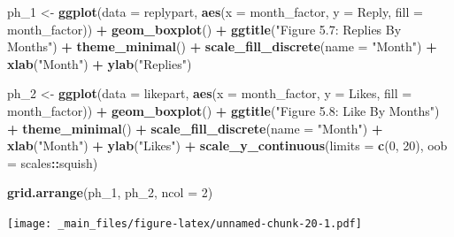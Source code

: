 \documentclass[
]{book}
\newenvironment{Shaded}{\begin{snugshade}}{\end{snugshade}}
\newcommand{\AttributeTok}[1]{\textcolor[rgb]{0.13,0.29,0.53}{#1}}
\newcommand{\DecValTok}[1]{\textcolor[rgb]{0.00,0.00,0.81}{#1}}
\newcommand{\FunctionTok}[1]{\textcolor[rgb]{0.13,0.29,0.53}{\textbf{#1}}}
\newcommand{\NormalTok}[1]{#1}
\newcommand{\OtherTok}[1]{\textcolor[rgb]{0.56,0.35,0.01}{#1}}
\newcommand{\SpecialCharTok}[1]{\textcolor[rgb]{0.81,0.36,0.00}{\textbf{#1}}}
\newcommand{\StringTok}[1]{\textcolor[rgb]{0.31,0.60,0.02}{#1}}
\begin{document}
\begin{Shaded}
\begin{Highlighting}[]
\NormalTok{ph\_1 }\OtherTok{\textless{}{-}} \FunctionTok{ggplot}\NormalTok{(}\AttributeTok{data =}\NormalTok{ replypart, }\FunctionTok{aes}\NormalTok{(}\AttributeTok{x =}\NormalTok{ month\_factor, }\AttributeTok{y =}\NormalTok{ Reply, }\AttributeTok{fill =}\NormalTok{ month\_factor)) }\SpecialCharTok{+}
  \FunctionTok{geom\_boxplot}\NormalTok{() }\SpecialCharTok{+}
  \FunctionTok{ggtitle}\NormalTok{(}\StringTok{"Figure 5.7: Replies By Months"}\NormalTok{) }\SpecialCharTok{+}
  \FunctionTok{theme\_minimal}\NormalTok{() }\SpecialCharTok{+}
  \FunctionTok{scale\_fill\_discrete}\NormalTok{(}\AttributeTok{name =} \StringTok{"Month"}\NormalTok{) }\SpecialCharTok{+} 
  \FunctionTok{xlab}\NormalTok{(}\StringTok{"Month"}\NormalTok{) }\SpecialCharTok{+} 
  \FunctionTok{ylab}\NormalTok{(}\StringTok{"Replies"}\NormalTok{)}

\NormalTok{ph\_2 }\OtherTok{\textless{}{-}} \FunctionTok{ggplot}\NormalTok{(}\AttributeTok{data =}\NormalTok{ likepart, }\FunctionTok{aes}\NormalTok{(}\AttributeTok{x =}\NormalTok{ month\_factor, }\AttributeTok{y =}\NormalTok{ Likes, }\AttributeTok{fill =}\NormalTok{ month\_factor)) }\SpecialCharTok{+}
  \FunctionTok{geom\_boxplot}\NormalTok{() }\SpecialCharTok{+}
  \FunctionTok{ggtitle}\NormalTok{(}\StringTok{"Figure 5.8: Like By Months"}\NormalTok{) }\SpecialCharTok{+}
  \FunctionTok{theme\_minimal}\NormalTok{() }\SpecialCharTok{+}
  \FunctionTok{scale\_fill\_discrete}\NormalTok{(}\AttributeTok{name =} \StringTok{"Month"}\NormalTok{) }\SpecialCharTok{+} 
  \FunctionTok{xlab}\NormalTok{(}\StringTok{"Month"}\NormalTok{) }\SpecialCharTok{+} 
  \FunctionTok{ylab}\NormalTok{(}\StringTok{"Likes"}\NormalTok{) }\SpecialCharTok{+}
  \FunctionTok{scale\_y\_continuous}\NormalTok{(}\AttributeTok{limits =} \FunctionTok{c}\NormalTok{(}\DecValTok{0}\NormalTok{, }\DecValTok{20}\NormalTok{), }\AttributeTok{oob =}\NormalTok{ scales}\SpecialCharTok{::}\NormalTok{squish)}

\FunctionTok{grid.arrange}\NormalTok{(ph\_1, ph\_2, }\AttributeTok{ncol =} \DecValTok{2}\NormalTok{)}
\end{Highlighting}
\end{Shaded}

\texttt{[image: \_main\_files/figure-latex/unnamed-chunk-20-1.pdf]}
\end{document}
